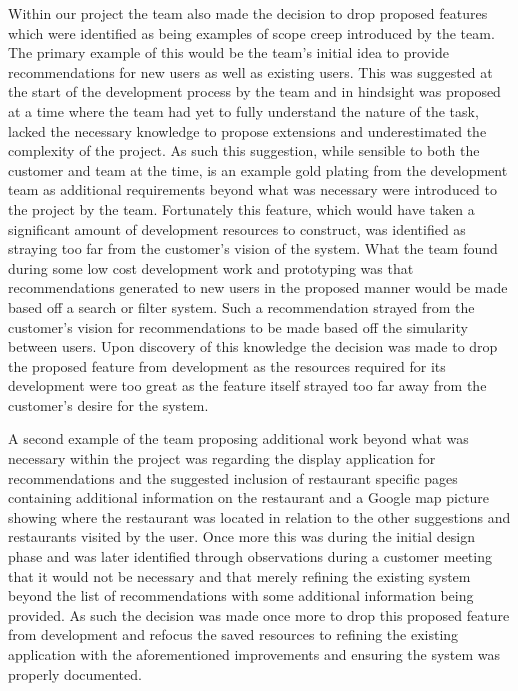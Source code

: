 \documentclass{l3proj}
\begin{document}
Within our project the team also made the decision to drop proposed features which were identified as being examples of scope creep introduced by the team. The primary example of this would be the team's initial idea to provide recommendations for new users as well as existing users. This was suggested at the start of the development process by the team and in hindsight was proposed at a time where the team had yet to fully understand the nature of the task, lacked the necessary knowledge to propose extensions and underestimated the complexity of the project. As such this suggestion, while sensible to both the customer and team at the time, is an example gold plating from the development team as additional requirements beyond what was necessary were introduced to the project by the team. Fortunately this feature, which would have taken a significant amount of development resources to construct, was identified as straying too far from the customer's vision of the system. What the team found during some low cost development work and prototyping was that recommendations generated to new users in the proposed manner would be made based off a search or filter system. Such a recommendation strayed from the customer's vision for recommendations to be made based off the simularity between users. Upon discovery of this knowledge the decision was made to drop the proposed feature from development as the resources required for its development were too great as the feature itself strayed too far away from the customer's desire for the system.  

A second example of the team proposing additional work beyond what was necessary within the project was regarding the display application for recommendations and the suggested inclusion of restaurant specific pages containing  additional information on the restaurant and a Google map picture showing where the restaurant was located in relation to the other suggestions and restaurants visited by the user. Once more this was during the initial design phase and was later identified through observations during a customer meeting that it would not be necessary and that merely refining the existing system beyond the list of recommendations with some additional information being provided. As such the decision was made once more to drop this proposed feature from development and refocus the saved resources to refining the existing application with the aforementioned improvements and ensuring the system was properly documented. 
\end{document}
